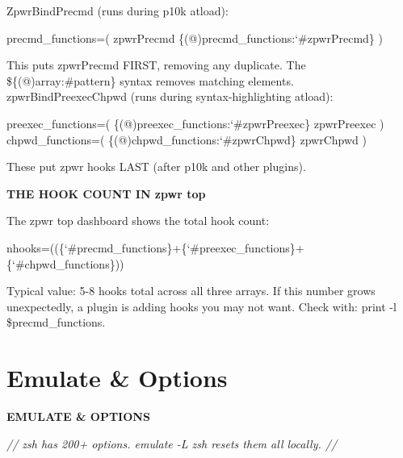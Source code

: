 \documentclass[11pt,a4paper,twoside]{book}
\begin{document}
ZpwrBindPrecmd (runs during p10k atload):

\begin{codebox}
\color{neongreen}precmd\_functions=( zpwrPrecmd \{(@)precmd\_functions:{\char`\#}zpwrPrecmd\} )\\
\end{codebox}

This puts zpwrPrecmd FIRST, removing any duplicate. The \$\{(@)array:\#pattern\} syntax removes matching elements. zpwrBindPreexecChpwd (runs during syntax-highlighting atload):

\begin{codebox}
\color{neongreen}preexec\_functions=( \{(@)preexec\_functions:{\char`\#}zpwrPreexec\} zpwrPreexec )\\
\color{neongreen}chpwd\_functions=( \{(@)chpwd\_functions:{\char`\#}zpwrChpwd\} zpwrChpwd )\\
\end{codebox}

These put zpwr hooks LAST (after p10k and other plugins).


\vspace{12pt}
{\bfseries\color{neonyellow} THE HOOK COUNT IN zpwr top}\vspace{4pt}

The zpwr top dashboard shows the total hook count:

\begin{codebox}
\color{neongreen}nhooks=((\{{\char`\#}precmd\_functions\}+\{{\char`\#}preexec\_functions\}+\{{\char`\#}chpwd\_functions\}))\\
\end{codebox}

Typical value: 5-8 hooks total across all three arrays. If this number grows unexpectedly, a plugin is adding hooks you may not want. Check with: print -l \$precmd\_functions.


\vspace{16pt}

\section{Emulate \& Options}


\vspace{10pt}
{\large\bfseries\color{neoncyan} EMULATE \& OPTIONS}\vspace{6pt}

{\small\itshape\color{dimtext} // zsh has 200+ options. emulate -L zsh resets them all locally. //}
\end{document}

